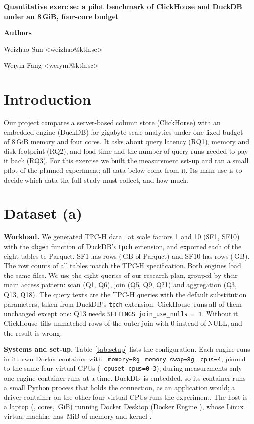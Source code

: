 \documentclass[11pt,a4paper]{article}
\newcommand{\Q}[1]{Q#1}
\newcommand{\CH}{ClickHouse}
\newcommand{\DK}{DuckDB}
\begin{document}
{\LARGE\bfseries Quantitative exercise: a pilot benchmark of ClickHouse and DuckDB under an 8\,GiB, four-core budget\par}
\vspace{14pt}
{\Large\bfseries Authors\par}
\vspace{6pt}
Weizhuo Sun <weizhuo@kth.se>

Weiyin Fang <weiyinf@kth.se>

\section{Introduction}

Our project compares a server-based column store (\CH) with an embedded engine (\DK) for gigabyte-scale analytics under one fixed budget of 8\,GiB memory and four cores.
It asks about query latency (RQ1), memory and disk footprint (RQ2), and load time and the number of query runs needed to pay it back (RQ3).
For this exercise we built the measurement set-up and ran a small pilot of the planned experiment; all data below come from it.
Its main use is to decide which data the full study must collect, and how much.

\section{Dataset (a)}

\textbf{Workload.} We generated TPC-H data~\cite{tpch} at scale factors 1 and 10 (SF1, SF10) with the \texttt{dbgen} function of \DK's \texttt{tpch} extension, and exported each of the eight tables to Parquet.
SF1 has  rows (\,GB of Parquet) and SF10 has  rows (\,GB).
The row counts of all tables match the TPC-H specification.
Both engines load the same files.
We use the eight queries of our research plan, grouped by their main access pattern: scan (\Q1, \Q6), join (\Q5, \Q9, \Q21) and aggregation (\Q3, \Q13, \Q18).
The query texts are the TPC-H queries with the default substitution parameters, taken from \DK's \texttt{tpch} extension.
\CH\ runs all of them unchanged except one: \Q13 needs \texttt{SETTINGS join\_use\_nulls = 1}.
Without it \CH\ fills unmatched rows of the outer join with 0 instead of NULL, and the result is wrong.

\textbf{Systems and set-up.} Table~\ref{tab:setup} lists the configuration.
Each engine runs in its own Docker container with \texttt{--memory=8g} \texttt{--memory-swap=8g} \texttt{--cpus=4}, pinned to the same four virtual CPUs (\texttt{--cpuset-cpus=0-3}); during measurements only one engine container runs at a time.
\DK\ is embedded, so its container runs a small Python process that holds the connection, as an application would; a driver container on the other four virtual CPUs runs the experiment.
The host is a laptop (,  cores, \,GiB) running Docker Desktop (Docker Engine ), whose Linux virtual machine has \,MiB of memory and kernel .
\end{document}
